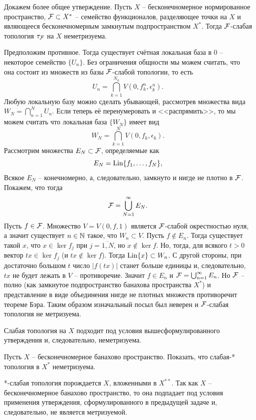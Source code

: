 \begin{solution}
    Докажем более общее утверждение.
    Пусть $X$ -- бесконечномерное нормированное пространство, $\mathcal{F} \subset X^*$ -- семейство функционалов, разделяющее точки на $X$ и являющееся бесконечномерным замкнутым подпространством $X^*$.
    Тогда $\mathcal{F}$-слабая топология $\tau_{\mathcal{F}}$ на $X$ неметризуема.

    Предположим противное.
    Тогда существует счётная локальная база в $0$ -- некоторое семейство $\{U_n\}$.
    Без ограничения общности мы можем считать, что она состоит из множеств из базы $\mathcal{F}$-слабой топологии, то есть
    \[
        U_n = \bigcap_{k = 1}^{N_n} V(0, f_k^n, \epsilon_k^n).
    \]
    Любую локальную базу можно сделать убывающей, рассмотрев множества вида $W_N = \bigcap_{n = 1}^{N} U_n$.
    Если теперь её перенумеровать и <<распрямить>>, то мы можем считать что локальная база $\{W_N\}$ имеет вид
    \[
        W_N = \bigcap_{k = 1}^{N} V(0, f_k, \epsilon_k).
    \]
    Рассмотрим множества $E_N \subset \mathcal{F}$, определяемые как
    \[
        E_N= \operatorname{Lin}\{f_1, \ldots, f_N\},
    \]
    Всякое $E_N$ -- конечномерно, а, следовательно, замкнуто и нигде не плотно в $\mathcal{F}$.
    Покажем, что тогда
    \[
        \mathcal{F} = \bigcup_{N = 1}^{\infty} E_N.
    \]
    Пусть $f \in \mathcal{F}$.
    Множество $V = V(0, f, 1)$ является $\mathcal{F}$-слабой окрестностью нуля, а значит существует $n \in \mathbb{N}$ такое, что $W_n \subset V$.
    Пусть $f \notin E_n$.
    Тогда существует такой $x$, что $x \in \ker f_j$ при $j = \overline{1, N}$, но $x \notin \ker f$.
    Но, тогда, для всякого $t > 0$ вектор $tx \in \ker f_j$ (и $tx \notin \ker f$).
    Тогда $\operatorname{Lin}\{x\} \subset W_n$.
    С другой стороны, при достаточно большом $t$ число $|f(tx)|$ станет больше единицы и, следовательно, $tx$ не будет лежать в $V$ -- противоречие.
    Значит $f \in E_n$ и $\mathcal{F} = \bigcup_{n = 1}^{\infty} E_n$.
    Но $\mathcal{F}$ -- полно (как замкнутое подпространство банахова пространства $X^*$) и представление в виде объединения нигде не плотных множеств противоречит теореме Бэра.
    Таким образом изначальный посыл был неверен и $\mathcal{F}$-слабая топология не метризуема.

    Слабая топология на $X$ подходит под условия вышесформулированного утверждения и, следовательно, неметризуема.
\end{solution}
\begin{task}[T5]
    Пусть $X$ -- бесконечномерное банахово пространство.
    Показать, что слабая-* топология в $X^*$ неметризуема.
\end{task}
\begin{solution}
    *-слабая топология порождается $X$, вложенными в $X^{**}$.
    Так как $X$ -- бесконечномерное банахово пространство, то она подпадает под условия применения утверждения, сформулированного в предыдущей задаче и, следовательно, не является метризуемой.
\end{solution}
